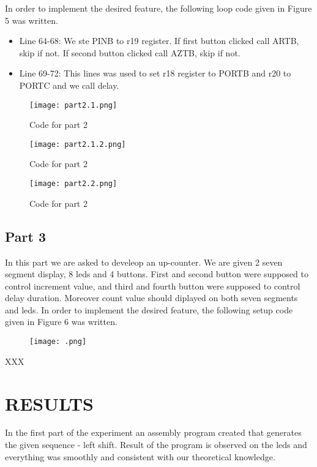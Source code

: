 \documentclass[pdftex,12pt,a4paper]{article}
\begin{document}
In order to implement the desired feature, the following loop code given in Figure 5 was written.\\

\begin{itemize}
    \item Line 64-68: We ste PINB to r19 register. If first button clicked call ARTB, skip if not. If second button clicked call AZTB, skip if not.
    \item Line 69-72: This lines was used to set r18 register to PORTB and r20 to PORTC and we call delay.
\end{itemize}

 \begin{figure}[ht]
	\centering
	\texttt{[image: part2.1.png]}	
	\caption{Code for part 2}
	\label{fig1}
\end{figure}

\begin{figure}[ht]
	\centering
	\texttt{[image: part2.1.2.png]}	
	\caption{Code for part 2}
	\label{fig1}
\end{figure}

\begin{figure}[ht]
	\centering
	\texttt{[image: part2.2.png]}	
	\caption{Code for part 2}
	\label{fig1}
\end{figure}

\clearpage
\subsection{Part 3}
In this part we are asked to develeop an up-counter. We are given 2 seven segment display, 8 leds and 4 buttons. First and second button were supposed to control increment value, and third and fourth button were supposed to control delay duration. Moreover count value should diplayed on both seven segments and leds.
In order to implement the desired feature, the following setup code given in Figure 6 was written.

\begin{figure}[ht]
	\centering
	\texttt{[image: .png]}	
	\caption{}
	\label{fig1}
\end{figure}

XXX

\section{RESULTS}

In the first part of the experiment an assembly program created that generates the given sequence - left shift. Result of the program is observed on the leds and everything was smoothly and consistent with our theoretical knowledge.
\end{document}
